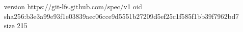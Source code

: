 version https://git-lfs.github.com/spec/v1
oid sha256:b3e3a99e93f1e03839aec06cce9d5551b27209d5ef25c1f585f1bb39f7962bd7
size 215
